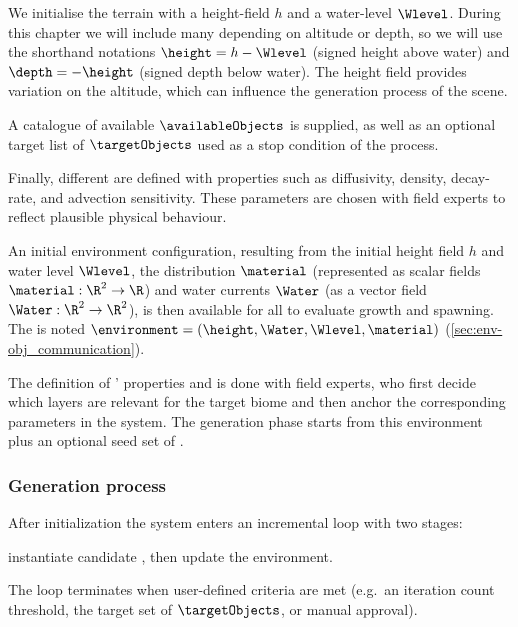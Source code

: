 We initialise the terrain with a height-field $h$ and a water-level $\Wlevel$. During this chapter we will include many  depending on altitude or depth, so we will use the shorthand notations $\height = h-\Wlevel$ (signed height above water) and $\depth=-\height$ (signed depth below water). The height field provides variation on the altitude, which can influence the generation process of the scene.

A catalogue of available  $\availableObjects$ is supplied, as well as an optional target list of  $\targetObjects$ used as a stop condition of the process.

Finally, different  are defined with properties such as diffusivity, density, decay-rate, and advection sensitivity. These parameters are chosen with field experts to reflect plausible physical behaviour.

An initial environment configuration, resulting from the initial height field $h$ and water level $\Wlevel$, the  distribution $\material$ (represented as scalar fields $\material: \R^2 \to \R$) and water currents $\Water$ (as a vector field $\Water: \R^2 \to \R^2$), is then available for all  to evaluate growth and spawning. The  is noted $\environment = (\height, \Water, \Wlevel, \material)$ (\cref{sec:env-obj_communication}).

The definition of ' properties and  is done with field experts, who first decide which  layers are relevant for the target biome and then anchor the corresponding parameters in the system.
The generation phase starts from this environment plus an optional seed set of .


\subsubsection{Generation process}

After initialization the system enters an incremental loop with two stages: 
\begin{Itemize}
    \Item{-} instantiate candidate , then  
    \Item{-} update the environment.  
\end{Itemize}
The loop terminates when user-defined criteria are met (e.g.\ an iteration count threshold, the target set of  $\targetObjects$, or manual approval).


